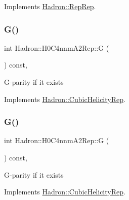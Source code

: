 Implements \mbox{\hyperlink{structHadron_1_1RepRep_a92c8802e5ed7afd7da43ccfd5b7cd92b}{Hadron\+::\+Rep\+Rep}}.

\mbox{\label{structHadron_1_1H0C4nnmA2Rep_a64418754427c737f79939aef4f18d294}} 
\subsubsection{\texorpdfstring{G()}{G()}\hspace{0.1cm}{\footnotesize\ttfamily [1/3]}}
{\footnotesize\ttfamily int Hadron\+::\+H0\+C4nnm\+A2\+Rep\+::G (\begin{DoxyParamCaption}{ }\end{DoxyParamCaption}) const\hspace{0.3cm}{\ttfamily [inline]}, {\ttfamily [virtual]}}

G-\/parity if it exists 

Implements \mbox{\hyperlink{structHadron_1_1CubicHelicityRep_a50689f42be1e6170aa8cf6ad0597018b}{Hadron\+::\+Cubic\+Helicity\+Rep}}.

\mbox{\label{structHadron_1_1H0C4nnmA2Rep_a64418754427c737f79939aef4f18d294}} 
\subsubsection{\texorpdfstring{G()}{G()}\hspace{0.1cm}{\footnotesize\ttfamily [2/3]}}
{\footnotesize\ttfamily int Hadron\+::\+H0\+C4nnm\+A2\+Rep\+::G (\begin{DoxyParamCaption}{ }\end{DoxyParamCaption}) const\hspace{0.3cm}{\ttfamily [inline]}, {\ttfamily [virtual]}}

G-\/parity if it exists 

Implements \mbox{\hyperlink{structHadron_1_1CubicHelicityRep_a50689f42be1e6170aa8cf6ad0597018b}{Hadron\+::\+Cubic\+Helicity\+Rep}}.

\mbox{\label{structHadron_1_1H0C4nnmA2Rep_a64418754427c737f79939aef4f18d294}} 
